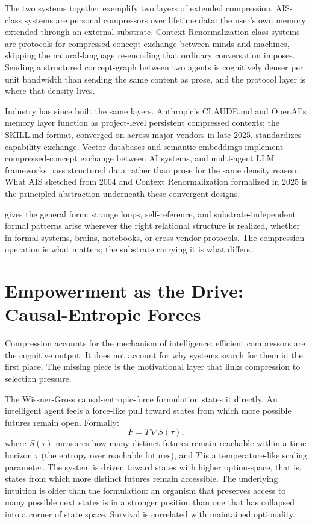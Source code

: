 \documentclass[11pt]{article}
\begin{document}
The two systems together exemplify two layers of extended compression. AIS-class systems are personal compressors over lifetime data: the user's own memory extended through an external substrate. Context-Renormalization-class systems are protocols for compressed-concept exchange between minds and machines, skipping the natural-language re-encoding that ordinary conversation imposes. Sending a structured concept-graph between two agents is cognitively denser per unit bandwidth than sending the same content as prose, and the protocol layer is where that density lives.

Industry has since built the same layers. Anthropic's CLAUDE.md and OpenAI's memory layer function as project-level persistent compressed contexts; the SKILL.md format, converged on across major vendors in late 2025, standardizes capability-exchange. Vector databases and semantic embeddings implement compressed-concept exchange between AI systems, and multi-agent LLM frameworks pass structured data rather than prose for the same density reason. What AIS sketched from 2004 and Context Renormalization formalized in 2025 is the principled abstraction underneath these convergent designs.

\citet{hofstadter1979} gives the general form: strange loops, self-reference, and substrate-independent formal patterns arise wherever the right relational structure is realized, whether in formal systems, brains, notebooks, or cross-vendor protocols. The compression operation is what matters; the substrate carrying it is what differs.

\section{Empowerment as the Drive: Causal-Entropic Forces}\label{sec:empowerment}

Compression accounts for the mechanism of intelligence: efficient compressors are the cognitive output. It does not account for why systems search for them in the first place. The missing piece is the motivational layer that links compression to selection pressure.

The Wissner-Gross causal-entropic-force formulation \citep{wissner_gross_2013} states it directly. An intelligent agent feels a force-like pull toward states from which more possible futures remain open. Formally:
\begin{equation}
F = T \, \nabla S(\tau),
\end{equation}
where $S(\tau)$ measures how many distinct futures remain reachable within a time horizon $\tau$ (the entropy over reachable futures), and $T$ is a temperature-like scaling parameter. The system is driven toward states with higher option-space, that is, states from which more distinct futures remain accessible. The underlying intuition is older than the formulation: an organism that preserves access to many possible next states is in a stronger position than one that has collapsed into a corner of state space. Survival is correlated with maintained optionality.
\end{document}
